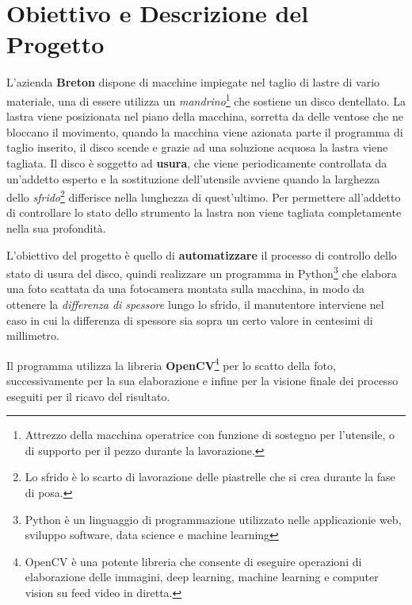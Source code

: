 \documentclass[a4paper, notitlepage, 12pt]{article}
\begin{document}
    \section{Obiettivo e Descrizione  del Progetto}\par
        \noindent L'azienda \textbf{Breton} dispone di macchine impiegate nel taglio di lastre di vario materiale,
        una di essere utilizza un \emph{mandrino}\footnote[0]{\indent Attrezzo della macchina operatrice con funzione di sostegno per l'utensile, o di supporto per il pezzo durante la lavorazione.} che sostiene un disco dentellato.
        La lastra viene posizionata nel piano della macchina, sorretta da delle ventose che ne bloccano il movimento,
        quando la macchina viene azionata parte il programma di taglio inserito, il disco scende e grazie ad una
        soluzione acquosa la lastra viene tagliata. Il disco è soggetto ad \textbf{usura}, che viene periodicamente controllata da un'addetto esperto e la 
        sostituzione dell'utensile avviene quando la larghezza dello \emph{sfrido}\footnote[1]{\indent Lo sfrido è lo scarto di lavorazione delle piastrelle che si crea durante la fase di posa.} differisce
        nella lunghezza di quest'ultimo. Per permettere all'addetto di controllare lo stato dello strumento la lastra
        non viene tagliata completamente nella sua profondità.\par
        \noindent L'obiettivo del progetto è quello di \textbf{automatizzare} il processo di controllo dello stato di usura 
        del disco, quindi realizzare un programma in Python\footnote[2]{\indent Python è un linguaggio di programmazione utilizzato nelle applicazionie web, sviluppo software, data science e machine learning} che elabora una foto 
        scattata da una fotocamera montata sulla macchina, in modo da ottenere la \emph{differenza di spessore} lungo lo sfrido, 
        il manutentore interviene nel caso in cui la differenza di spessore sia sopra un certo valore in centesimi di millimetro.\par
        \noindent Il programma utilizza la libreria \textbf{OpenCV}\footnote[3]{\indent OpenCV è una potente libreria che consente di eseguire operazioni di elaborazione delle immagini, deep learning, machine learning e computer vision su feed video in diretta.} per lo scatto della foto, successivamente 
        per la sua elaborazione e infine per la visione finale dei processo eseguiti per il ricavo del risultato.
    \pagebreak
\end{document}
